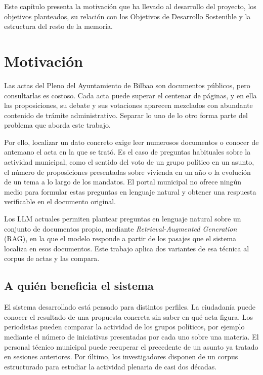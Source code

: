 \documentclass[11pt, a4paper]{report}
\begin{document}
	Este capítulo presenta la motivación que ha llevado al desarrollo del
	proyecto, los objetivos planteados, su relación con los Objetivos de
	Desarrollo Sostenible y la estructura del resto de la memoria.

	\section{Motivación}

	Las actas del Pleno del Ayuntamiento de Bilbao son documentos públicos, pero
	consultarlas es costoso. Cada acta puede superar el centenar de páginas, y en
	ella las proposiciones, su
	debate y sus votaciones aparecen mezclados con abundante contenido de trámite
	administrativo. Separar lo uno de lo otro forma parte del problema que aborda
	este trabajo.

	Por ello, localizar un dato concreto exige leer numerosos
	documentos o conocer de antemano el acta en la que se trató.
	Es el caso de preguntas habituales sobre la actividad municipal, como el
	sentido del voto de un grupo político en un asunto, el número de proposiciones
	presentadas sobre vivienda en un año o la evolución de un tema a lo largo de
	los mandatos. El portal municipal no ofrece ningún medio para formular estas
	preguntas en lenguaje natural y obtener una respuesta verificable en el
	documento original.

	Los LLM actuales permiten plantear preguntas en lenguaje
	natural sobre un conjunto de documentos propio, mediante \textit{Retrieval-Augmented Generation} (RAG), en la que el modelo responde
	a partir de los pasajes que el sistema localiza en esos documentos. Este
	trabajo aplica dos variantes de esa técnica al corpus de actas y las compara.

	\subsection{A quién beneficia el sistema}
	\label{sec:beneficiarios}

	El sistema desarrollado está pensado para distintos perfiles. La
	ciudadanía puede conocer el resultado de una propuesta concreta sin saber en
	qué acta figura. Los periodistas pueden comparar la actividad de los grupos
	políticos, por ejemplo mediante el número de iniciativas presentadas por cada
	uno sobre una materia. El personal técnico municipal puede recuperar el
	precedente de un asunto ya tratado en sesiones anteriores. Por último, los
	investigadores disponen de un corpus estructurado para estudiar la actividad
	plenaria de casi dos décadas.
\end{document}
